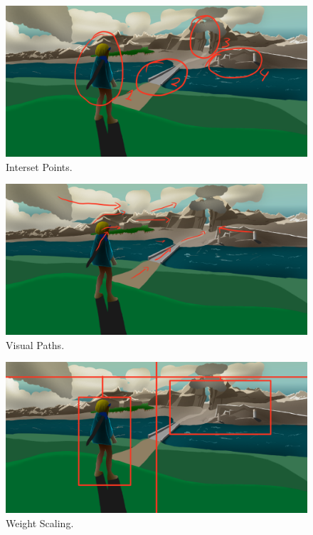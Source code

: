 \documentclass{cup-pan}
\begin{document}
            \begin{figure}[H]
                \includegraphics[width=\textwidth]{Imagenes/Fanart1/Analysis/puntosinteres.png}
                \caption{Interset Points.}
            \end{figure}

            \begin{figure}[H]
                \includegraphics[width=\textwidth]{Imagenes/Fanart1/Analysis/recorridovisual.png}
                \caption{Visual Paths.}
            \end{figure}

            \begin{figure}[H]
                \includegraphics[width=\textwidth]{Imagenes/Fanart1/Analysis/balanza.png}
                \caption{Weight Scaling.}
            \end{figure}
\end{document}

